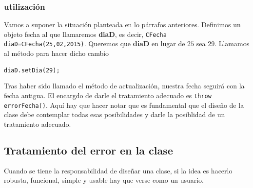 \documentclass[10pt,a4paper]{article}
\begin{document}
\subsubsection*{utilizaci\'on}

Vamos a suponer la situaci\'on planteada en lo p\'arrafos anteriores. Definimos un objeto fecha al que llamaremos \textbf{diaD}, es decir, \texttt{CFecha diaD=CFecha(25,02,2015)}. Queremos que \textbf{diaD} en lugar de  $25$ sea $29$. Llamamos al m\'etodo para hacer dicho cambio

\texttt{diaD.setDia(29);}

Tras haber sido llamado el m\'etodo de actualizaci\'on, nuestra fecha seguir\'a con la fecha antigua. El encargdo de darle el tratamiento adecuado es \texttt{throw errorFecha()}. Aqu\'i hay que hacer notar que es fundamental que el dise\~no de la clase debe contemplar todas esas posibilidades y darle la posiblidad de un tratamiento adecuado. 

\subsection*{Tratamiento del error en la clase}
Cuando se tiene la responsabilidad de dise\~nar una clase, si la idea es hacerlo robusta, funcional, simple y usable hay que verse como un usuario. 
\end{document}
